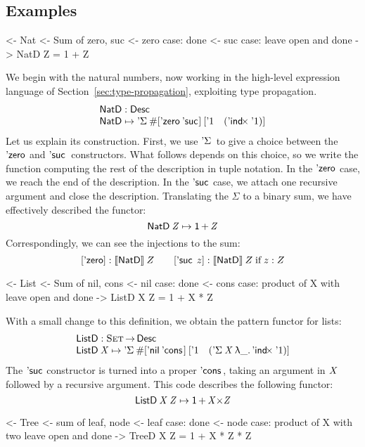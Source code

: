 \subsection{Examples}
\label{sec:desc-examples}

\begin{wstructure}
<- Nat
    <- Sum of zero, suc
    <- zero case: done
    <- suc case: leave open and done
    -> NatD Z = 1 + Z
\end{wstructure}

We begin with the natural numbers, now working in the high-level
expression language of Section~\ref{sec:type-propagation}, exploiting
type propagation.
%
\[\stk{
\NatD : \Desc \\
\NatD \mapsto \DSigma{\EnumT{\sqr{\NatZero\: \NatSuc{\!} }}}
                     {\sqr{ \DUnit \quad (\DIndx{\DUnit}) }}
}\]
%
Let us explain its construction. First, we use $\DSigma{\!}{\!}$ to
give a choice between the $\NatZero$ and $\NatSuc{}$ constructors.
What follows depends on this choice, so we write the function
computing the rest of the description in tuple notation.  In the
$\NatZero$ case, we reach the end of the description. In the
$\NatSuc{\!}$ case, we attach one recursive argument and close the
description. Translating the \(\Sigma\) to a binary sum, we have
effectively described the functor:
%
\[    \NatD\: \V{Z} \mapsto \Unit \mathop{\D{+}} \V{Z}    \]
Correspondingly, we can see the injections to the sum:
\[
\sqr{\NatZero}:\descop{\NatD}Z \qquad
\sqr{\NatSuc\:z}:\descop{\NatD}Z \;\mbox{if}\;z:Z
\]

\begin{wstructure}
<- List
    <- Sum of nil, cons
    <- nil case: done
    <- cons case: product of X with leave open and done
    -> ListD X Z = 1 + X * Z
\end{wstructure}

With a small change to this definition, we obtain the pattern functor
for lists:
%
\[\stk{
\ListD : \Set \To \Desc \\
\ListD \: \V{X} \mapsto
 \DSigma{\EnumT{\sqr{ \ListNil\: \ListCons{\!}{\!} }}}
         {\sqr{ \DUnit \quad (\DSigma{\V{X}}{\LAM{\_} \DIndx{\DUnit}}) }}
}\]
%
The $\NatSuc{\!}$ constructor is turned into a proper
$\ListCons{\!}{\!}$, taking an argument in $\V{X}$ followed by a
recursive argument. This code describes the following functor:
%
\[    \ListD\: \V{X}\: \V{Z} \mapsto \Unit \mathop{\D{+}} \V{X} \D{\ensuremath{\times}} \V{Z}     \]

\begin{wstructure}
<- Tree
    <- sum of leaf, node
    <- leaf case: done
    <- node case: product of X with two leave open and done
    -> TreeD X Z = 1 + X * Z * Z
\end{wstructure}

